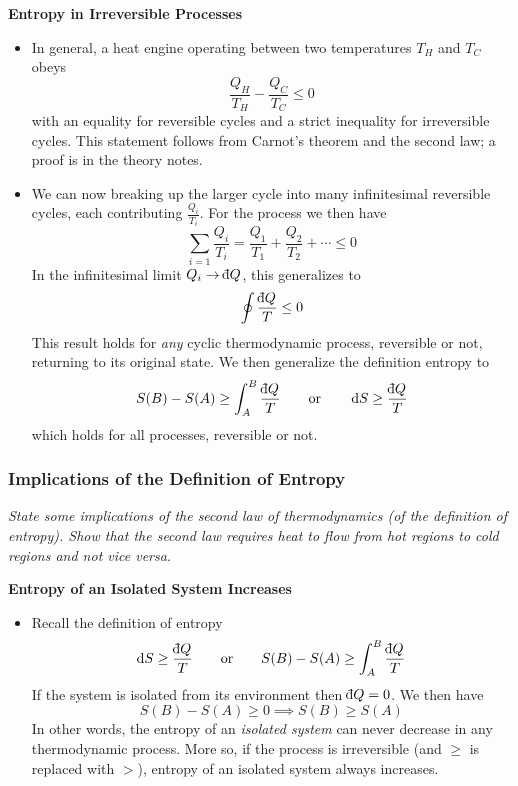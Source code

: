 \documentclass[11pt, a4paper]{article}
\newcommand{\eqtext}[1]{\qquad \text{#1} \qquad}
\newcommand{\diff}{\mathop{}\!\mathrm{d}} %
\newcommand{\dbar}{{\mathchar '26\mkern -11mu \mathrm{d}}} %
\begin{document}
\textbf{Entropy in Irreversible Processes}
\begin{itemize}
	\item In general, a heat engine operating between two temperatures $ T_{H} $ and $ T_{C} $ obeys
	\begin{equation*}
		\frac{Q_{H}}{T_{H}} - \frac{Q_{C}}{T_{C}} \leq 0
	\end{equation*}
	with an equality for reversible cycles and a strict inequality for irreversible cycles. This statement follows from Carnot's theorem and the second law; a proof is in the theory notes.
 
 	
	\item We can now breaking up the larger cycle into many infinitesimal reversible cycles, each contributing $ \frac{Q_{i}}{T_{i}} $. For the process we then have
	\begin{equation*}
		\sum_{i=1} \frac{Q_{i}}{T_{i}} = \frac{Q_{1}}{T_{1}} + \frac{Q_{2}}{T_{2}} + \cdots \leq 0
	\end{equation*}
	In the infinitesimal limit $ Q_{i} \to \dbar Q $, this generalizes to
	\begin{equation*}
		\oint \frac{\dbar Q}{T} \leq 0
	\end{equation*}
	This result holds for \textit{any} cyclic thermodynamic process, reversible or not, returning to its original state. We then generalize the definition entropy to 
	\begin{equation*}
		S(B) - S(A) \geq \int_{A}^{B} \frac{\dbar Q}{T} \eqtext{or} \diff S \geq \frac{\dbar Q}{T} 
	\end{equation*}
	which holds for all processes, reversible or not. 

\end{itemize}

\subsubsection{Implications of the Definition of Entropy}
\textit{State some implications of the second law of thermodynamics (of the definition of entropy). Show that the second law requires heat to flow from hot regions to cold regions and not vice versa.}

\smallskip
\textbf{Entropy of an Isolated System Increases}
\begin{itemize}
	\item Recall the definition of entropy
	\begin{equation*}
		\diff S \geq \frac{\dbar Q}{T} \eqtext{or} S(B) - S(A) \geq \int_{A}^{B} \frac{\dbar Q}{T} 
	\end{equation*}
	If the system is isolated from its environment then $ \dbar Q = 0 $. We then have
	\begin{equation*}
		S(B) - S(A) \geq 0  \implies S(B) \geq S(A)
	\end{equation*}
	In other words, the entropy of an \textit{isolated system} can never decrease in any thermodynamic process. More so, if the process is irreversible (and $ \geq $ is replaced with $ > $), entropy of an isolated system always increases.
\end{itemize}
\end{document}
